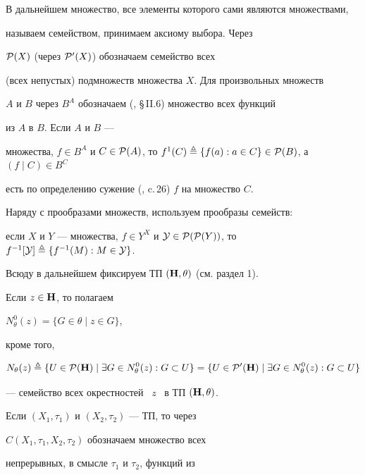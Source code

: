 В дальнейшем множество, все элементы которого сами являются множествами,


называем семейством, принимаем аксиому выбора. Через


${\cal P}(X)$ (через ${\cal P}'(X)$) обозначаем семейство всех


(всех непустых) подмножеств множества $X$. Для произвольных множеств


$A$ и $B$ через $B^A$ обозначаем (\cite{3}, \S\,II.6) множество всех функций


из $A$ в $B$. Если $A$ и $B$ ---


множества, $f \in {B^A}$ и $C \in {{\cal P}(A)}$, то ${f^1}(C) \triangleq


\{f(a):a \in C\} \in {\cal P}(B)$, а $(f\mid{C}) \in {B^C}$


есть по определению сужение (\cite{1}, c.\,26) $f$ на множество $C$.


Наряду с прообразами множеств, используем прообразы семейств:


если $X$ и $Y$ --- множества, $f \in Y^X$ и ${\cal Y} \in


{\cal P}({\cal P}(Y))$, то ${f^{-1}}[{\cal Y}] \triangleq \{{f^{-1}}(M):


M \in {\cal Y}\}$.





Всюду в дальнейшем фиксируем ТП $({\bold H},\theta)$ (см. раздел 1).


Если $z \in {\bold H}$, то полагаем


${N_\theta^0}(z) = \{G \in \theta \mid z \in G\}$,


кроме того,


$$


{N_\theta}(z) \triangleq \{U \in {\cal P}({\bold H}) \mid \exi{G} \in


{N_\theta^0}(z):G \subset U\} =


\{U \in {\cal P}'({\bold


H}) \mid \exi{G} \in {N_\theta^0}(z):G \subset U\}


$$


--- семейство всех окрестностей \, $z$ \, в ТП $({\bold H},\theta)$.


Если $({X_1},{{\tau}_1})$ и $({X_2},{{\tau}_2})$ --- ТП, то через


$C({X_1},{{\tau}_1},{X_2},{{\tau}_2})$ обозначаем множество всех


непрерывных, в смысле ${\tau}_1$ и ${\tau}_2$, функций из


